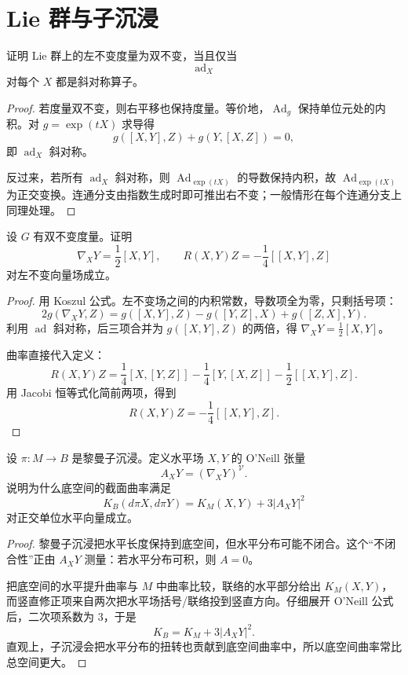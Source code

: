 \documentclass[11pt,a4paper,openany]{ctexbook}
\numberwithin{equation}{chapter}
\begin{document}
\section{Lie 群与子沉浸}

\begin{problem}
证明 Lie 群上的左不变度量为双不变，当且仅当
\[
\operatorname{ad}_X
\]
对每个 \(X\) 都是斜对称算子。
\end{problem}
\begin{proof}
若度量双不变，则右平移也保持度量。等价地，\(\operatorname{Ad}_g\) 保持单位元处的内积。对 \(g=\exp(tX)\) 求导得
\[
g([X,Y],Z)+g(Y,[X,Z])=0,
\]
即 \(\operatorname{ad}_X\) 斜对称。

反过来，若所有 \(\operatorname{ad}_X\) 斜对称，则 \(\operatorname{Ad}_{\exp(tX)}\) 的导数保持内积，故 \(\operatorname{Ad}_{\exp(tX)}\) 为正交变换。连通分支由指数生成时即可推出右不变；一般情形在每个连通分支上同理处理。
\end{proof}

\begin{problem}
设 \(G\) 有双不变度量。证明
\[
\nabla_XY=\frac12[X,Y],\qquad
R(X,Y)Z=-\frac14[[X,Y],Z]
\]
对左不变向量场成立。
\end{problem}
\begin{proof}
用 Koszul 公式。左不变场之间的内积常数，导数项全为零，只剩括号项：
\[
2g(\nabla_XY,Z)=g([X,Y],Z)-g([Y,Z],X)+g([Z,X],Y).
\]
利用 \(\operatorname{ad}\) 斜对称，后三项合并为 \(g([X,Y],Z)\) 的两倍，得 \(\nabla_XY=\frac12[X,Y]\)。

曲率直接代入定义：
\[
R(X,Y)Z=\frac14[X,[Y,Z]]-\frac14[Y,[X,Z]]-\frac12[[X,Y],Z].
\]
用 Jacobi 恒等式化简前两项，得到
\[
R(X,Y)Z=-\frac14[[X,Y],Z].
\]
\end{proof}

\begin{problem}
设 \(\pi\colon M\to B\) 是黎曼子沉浸。定义水平场 \(X,Y\) 的 O'Neill 张量
\[
A_XY=(\nabla_XY)^{\mathcal V}.
\]
说明为什么底空间的截面曲率满足
\[
K_B(d\pi X,d\pi Y)=K_M(X,Y)+3|A_XY|^2
\]
对正交单位水平向量成立。
\end{problem}
\begin{proof}
黎曼子沉浸把水平长度保持到底空间，但水平分布可能不闭合。这个“不闭合性”正由 \(A_XY\) 测量：若水平分布可积，则 \(A=0\)。

把底空间的水平提升曲率与 \(M\) 中曲率比较，联络的水平部分给出 \(K_M(X,Y)\)，而竖直修正项来自两次把水平场括号/联络投到竖直方向。仔细展开 O'Neill 公式后，二次项系数为 \(3\)，于是
\[
K_B=K_M+3|A_XY|^2.
\]
直观上，子沉浸会把水平分布的扭转也贡献到底空间曲率中，所以底空间曲率常比总空间更大。
\end{proof}
\end{document}
